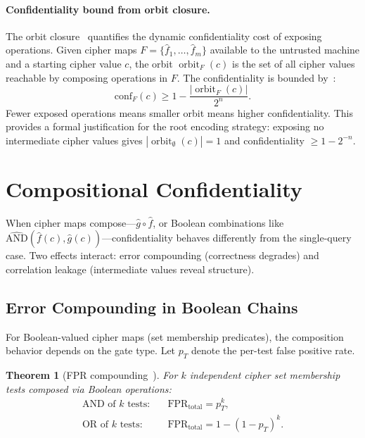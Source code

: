 \documentclass[11pt]{article}
\theoremstyle{definition}
\theoremstyle{plain}
\newtheorem{theorem}{Theorem}[section]
\theoremstyle{remark}
\newcommand{\fhat}{\hat{f}}
\newcommand{\ghat}{\hat{g}}
\DeclareMathOperator{\orbitF}{orbit}
\begin{document}
\paragraph{Confidentiality bound from orbit closure.}
The orbit closure~\cite[Sec.~5]{towell2026algebraic} quantifies the
dynamic confidentiality cost of exposing operations.  Given cipher maps
$F = \{\fhat_1, \ldots, \fhat_m\}$ available to the untrusted machine
and a starting cipher value $c$, the orbit
$\orbitF_F(c)$ is the set of all cipher values reachable by composing
operations in $F$.  The confidentiality is bounded
by~\cite[Thm.~5.3]{towell2026algebraic}:
\begin{equation}
\mathrm{conf}_F(c) \geq 1 - \frac{|\orbitF_F(c)|}{2^n}.
\end{equation}
Fewer exposed operations means smaller orbit means higher
confidentiality.  This provides a formal justification for the root
encoding strategy: exposing no intermediate cipher values gives
$|\orbitF_\emptyset(c)| = 1$ and confidentiality $\geq 1 - 2^{-n}$.


\section{Compositional Confidentiality}
\label{sec:composition}

When cipher maps compose---$\ghat \circ \fhat$, or Boolean combinations
like $\widehat{\mathrm{AND}}(\fhat(c), \ghat(c))$---confidentiality
behaves differently from the single-query case.  Two effects interact:
error compounding (correctness degrades) and correlation leakage
(intermediate values reveal structure).

\subsection{Error Compounding in Boolean Chains}

For Boolean-valued cipher maps (set membership predicates), the
composition behavior depends on the gate type.  Let $p_T$ denote the
per-test false positive rate.

\begin{theorem}[FPR compounding~{\cite[Sec.~8]{towell2026cipher}}]
\label{thm:fpr-compounding}
For $k$ independent cipher set membership tests composed via Boolean
operations:
\begin{align}
\text{AND of } k \text{ tests:} &\quad
  \mathrm{FPR}_{\mathrm{total}} = p_T^k, \\
\text{OR of } k \text{ tests:} &\quad
  \mathrm{FPR}_{\mathrm{total}} = 1 - (1 - p_T)^k.
\end{align}
\end{theorem}
\end{document}
